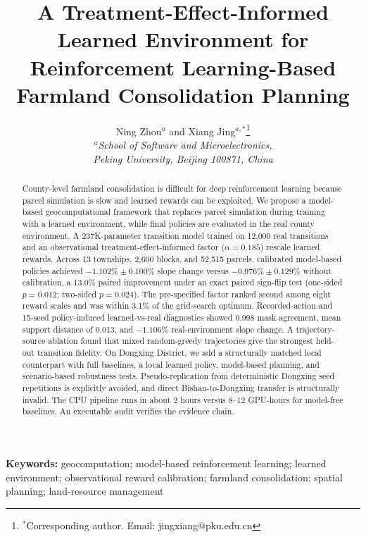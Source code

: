 \documentclass[11pt]{article}
\begin{document}
\title{A Treatment-Effect-Informed Learned Environment for Reinforcement Learning-Based Farmland Consolidation Planning}

\author{Ning Zhou$^{a}$ and Xiang Jing$^{a,\ast}$\thanks{$^\ast$Corresponding author. Email: jingxiang@pku.edu.cn}\\
$^{a}${\em School of Software and Microelectronics,}\\
{\em Peking University, Beijing 100871, China}}

\date{}
\maketitle

\begin{abstract}
County-level farmland consolidation is difficult for deep reinforcement learning because parcel simulation is slow and learned rewards can be exploited. We propose a model-based geocomputational framework that replaces parcel simulation during training with a learned environment, while final policies are evaluated in the real county environment. A 237K-parameter transition model trained on 12{,}000 real transitions and an observational treatment-effect-informed factor ($\alpha=0.185$) rescale learned rewards. Across 13 townships, 2{,}600 blocks, and 52{,}515 parcels, calibrated model-based policies achieved $-1.102\% \pm 0.100\%$ slope change versus $-0.976\% \pm 0.129\%$ without calibration, a 13.0\% paired improvement under an exact paired sign-flip test (one-sided $p=0.012$; two-sided $p=0.024$). The pre-specified factor ranked second among eight reward scales and was within 3.1\% of the grid-search optimum. Recorded-action and 15-seed policy-induced learned-vs-real diagnostics showed 0.998 mask agreement, mean support distance of 0.013, and $-1.106\%$ real-environment slope change. A trajectory-source ablation found that mixed random-greedy trajectories give the strongest held-out transition fidelity. On Dongxing District, we add a structurally matched local counterpart with full baselines, a local learned policy, model-based planning, and scenario-based robustness tests. Pseudo-replication from deterministic Dongxing seed repetitions is explicitly avoided, and direct Bishan-to-Dongxing transfer is structurally invalid. The CPU pipeline runs in about 2 hours versus 8--12 GPU-hours for model-free baselines. An executable audit verifies the evidence chain.
\end{abstract}

\noindent\textbf{Keywords:} geocomputation; model-based reinforcement learning; learned environment; observational reward calibration; farmland consolidation; spatial planning; land-resource management
\end{document}
